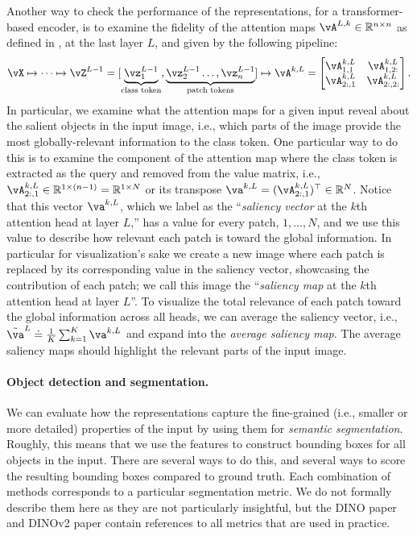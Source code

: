 \documentclass[../../book-main.tex]{subfiles}
\begin{document}
Another way to check the performance of the representations, for a transformer-based encoder, is to examine the fidelity of the attention maps \(\vA^{L, k} \in \R^{n \times n}\) as defined in , at the last layer \(L\), and given by the following pipeline:
\begin{align}
    \vX \mapsto \cdots \mapsto \vZ^{L - 1} = [\underbrace{\vz_{1}^{L - 1}}_{\text{class token}}, \underbrace{\vz_{2}^{L - 1} \dots, \vz_{n}^{L - 1}}_{\text{patch tokens}}] \mapsto \vA^{k, L} = \mat{\vA_{1, 1}^{k, L} & \vA_{1, 2:}^{k, L} \\ \vA_{2:, 1}^{k, L} & \vA_{2:, 2:}^{k, L}}.
\end{align}
In particular, we examine what the attention maps for a given input reveal about the salient objects in the input image, i.e., which parts of the image provide the most globally-relevant information to the class token. One particular way to do this is to examine the component of the attention map where the class token is extracted as the query and removed from the value matrix, i.e., \(\vA_{2:, 1}^{k, L} \in \R^{1 \times (n - 1)} = \R^{1 \times N}\) or its transpose \(\va^{k, L} = (\vA_{2:, 1}^{k, L})^{\top} \in \R^{N}\). Notice that this vector \(\va^{k, L}\), which we label as the ``\textit{saliency vector} at the \(k\)th attention head at layer \(L\),'' has a value for every patch, \(1, \dots, N\), and we use this value to describe how relevant each patch is toward the global information. In particular for visualization's sake we create a new image where each patch is replaced by its corresponding value in the saliency vector, showcasing the contribution of each patch; we call this image the ``\textit{saliency map} at the \(k\)th attention head at layer \(L\)''. To visualize the total relevance of each patch toward the global information across all heads, we can average the saliency vector, i.e., \(\tilde{\va}^{L} \doteq \frac{1}{K}\sum_{k = 1}^{K}\va^{k, L}\) and expand into the \textit{average saliency map}. The average saliency maps should highlight the relevant parts of the input image.


\paragraph{Object detection and segmentation.}

We can evaluate how the representations capture the fine-grained (i.e., smaller or more detailed) properties of the input by using them for \textit{semantic segmentation}. Roughly, this means that we use the features to construct bounding boxes for all objects in the input. There are several ways to do this, and several ways to score the resulting bounding boxes compared to ground truth. Each combination of methods corresponds to a particular segmentation metric. We do not formally describe them here as they are not particularly insightful, but the DINO paper \citep{caron2021emerging} and DINOv2 paper \citep{oquab2023dinov2} contain references to all metrics that are used in practice.
\end{document}
